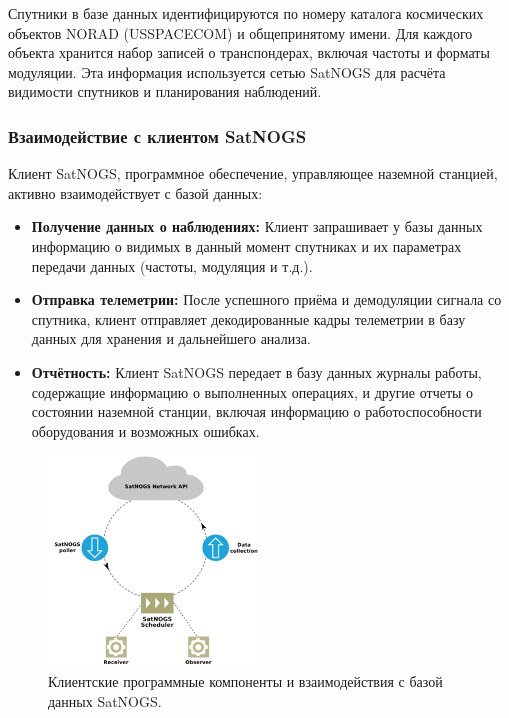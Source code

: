 \documentclass[12pt, a4paper]{extreport}
\begin{document}
Спутники в базе данных идентифицируются по номеру каталога космических объектов NORAD (USSPACECOM) и общепринятому имени. Для каждого объекта хранится набор записей о транспондерах, включая частоты и форматы модуляции. Эта информация используется сетью SatNOGS для расчёта видимости спутников и планирования наблюдений.

\subsubsection{Взаимодействие с клиентом SatNOGS}

Клиент SatNOGS, программное обеспечение, управляющее наземной станцией, активно взаимодействует с базой данных:

\begin{itemize}
\item \textbf{Получение данных о наблюдениях:} Клиент запрашивает у базы данных информацию о видимых в данный момент спутниках и их параметрах передачи данных (частоты, модуляция и т.д.).  
\item \textbf{Отправка телеметрии:} После успешного приёма и демодуляции сигнала со спутника, клиент отправляет декодированные кадры телеметрии в базу данных для хранения и дальнейшего анализа. 
\item \textbf{Отчётность:} Клиент SatNOGS передает в базу данных журналы работы, содержащие информацию о выполненных операциях,  и другие отчеты о состоянии наземной станции, включая информацию о работоспособности оборудования и возможных ошибках. 
\end{itemize}

\begin{figure}[h!]
\centering
\includegraphics[width=0.5\textwidth]{satnogs_client_program_interactions.png}
\caption{Клиентские программные компоненты и взаимодействия с базой данных SatNOGS.}
\label{fig:satnogs_client_program_interactions}
\end{figure}
\end{document}
